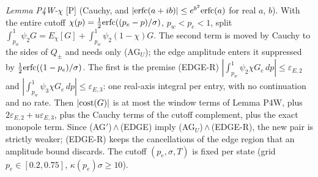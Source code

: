\documentclass[aps,prl,onecolumn,superscriptaddress,nofootinbib]{revtex4-2}
\begin{document}
\emph{Lemma P4W-$\chi$} [P] (Cauchy, and $|{\rm erfc}(a+ib)|\le e^{b^2}{\rm erfc}(a)$ for real $a$, $b$). With the entire cutoff
$\chi(p)=\tfrac12{\rm erfc}((p_e-p)/\sigma)$, $p_w<p_e<1$, split $\int_{p_w}^1\psi_2G=E_\chi[G]+\int_{p_w}^1\psi_2(1-\chi)G$. The second
term is moved by Cauchy to the sides of $Q_\pm$ and needs only (AG$_U$); the edge amplitude enters it suppressed by
$\tfrac12{\rm erfc}((1-p_e)/\sigma)$. The first is the premise
(EDGE-R) $|\int_{p_w}^1\psi_2\chi G_e\,dp|\le\varepsilon_{E,2}$ and $|\int_{p_w}^1\psi_3\chi G_e\,dp|\le\varepsilon_{E,3}$: one real-axis
integral per entry, with no continuation and no rate.
Then $|{\rm cost}(G)|$ is at most the window terms of Lemma P4W, plus $2\varepsilon_{E,2}+u\varepsilon_{E,3}$, plus the Cauchy terms of
the cutoff complement, plus the exact monopole term. Since (AG$'$)\,$\wedge$\,(EDGE) imply (AG$_U$)\,$\wedge$\,(EDGE-R), the new pair is
strictly weaker; (EDGE-R) keeps the cancellations of the edge region that an amplitude bound discards. The cutoff $(p_e,\sigma,T)$ is
fixed per state (grid $p_e\in[0.2,0.75]$, $\kappa(p_e)\sigma\ge10$).
\end{document}
